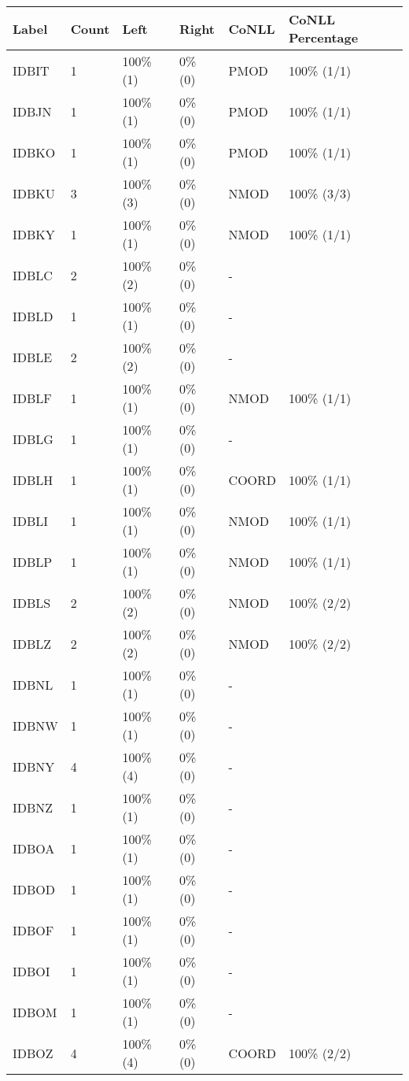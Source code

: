 \begin{figure*}
\begin{tabular}{|l|l|l|l||l|l|}
\hline
Label & Count & Left & Right & CoNLL & CoNLL Percentage\\ 
\hline
 IDBIT & 1 & 100\% (1) & 0\% (0) & PMOD & 100\% (1/1) \\ 
\hline
 IDBJN & 1 & 100\% (1) & 0\% (0) & PMOD & 100\% (1/1) \\ 
\hline
 IDBKO & 1 & 100\% (1) & 0\% (0) & PMOD & 100\% (1/1) \\ 
\hline
 IDBKU & 3 & 100\% (3) & 0\% (0) & NMOD & 100\% (3/3) \\ 
\hline
 IDBKY & 1 & 100\% (1) & 0\% (0) & NMOD & 100\% (1/1) \\ 
\hline
 IDBLC & 2 & 100\% (2) & 0\% (0) & - &  \\ 
\hline
 IDBLD & 1 & 100\% (1) & 0\% (0) & - &  \\ 
\hline
 IDBLE & 2 & 100\% (2) & 0\% (0) & - &  \\ 
\hline
 IDBLF & 1 & 100\% (1) & 0\% (0) & NMOD & 100\% (1/1) \\ 
\hline
 IDBLG & 1 & 100\% (1) & 0\% (0) & - &  \\ 
\hline
 IDBLH & 1 & 100\% (1) & 0\% (0) & COORD & 100\% (1/1) \\ 
\hline
 IDBLI & 1 & 100\% (1) & 0\% (0) & NMOD & 100\% (1/1) \\ 
\hline
 IDBLP & 1 & 100\% (1) & 0\% (0) & NMOD & 100\% (1/1) \\ 
\hline
 IDBLS & 2 & 100\% (2) & 0\% (0) & NMOD & 100\% (2/2) \\ 
\hline
 IDBLZ & 2 & 100\% (2) & 0\% (0) & NMOD & 100\% (2/2) \\ 
\hline
 IDBNL & 1 & 100\% (1) & 0\% (0) & - &  \\ 
\hline
 IDBNW & 1 & 100\% (1) & 0\% (0) & - &  \\ 
\hline
 IDBNY & 4 & 100\% (4) & 0\% (0) & - &  \\ 
\hline
 IDBNZ & 1 & 100\% (1) & 0\% (0) & - &  \\ 
\hline
 IDBOA & 1 & 100\% (1) & 0\% (0) & - &  \\ 
\hline
 IDBOD & 1 & 100\% (1) & 0\% (0) & - &  \\ 
\hline
 IDBOF & 1 & 100\% (1) & 0\% (0) & - &  \\ 
\hline
 IDBOI & 1 & 100\% (1) & 0\% (0) & - &  \\ 
\hline
 IDBOM & 1 & 100\% (1) & 0\% (0) & - &  \\ 
\hline
 IDBOZ & 4 & 100\% (4) & 0\% (0) & COORD & 100\% (2/2) \\ 

\end{tabular}
\end{figure*}
